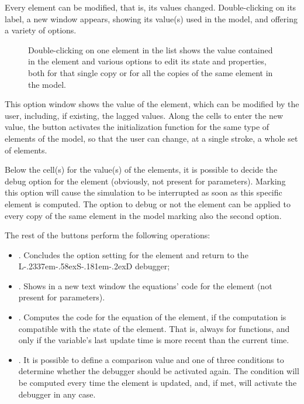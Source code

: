 \documentclass [11pt,a4paper] {book}
\def\LsD{{L\kern-.2337em\lower-.58ex\hbox{S}\kern-.181em\lower-.2ex\hbox{D}}\xspace}
\begin{document}
Every element can be modified, that is, its values changed. Double-clicking on its label, a new window appears, showing its value(s) used in the model, and offering a variety of options.


\begin{figure}[ht]
  \centering
  \caption{\small Double-clicking on one element in the list shows the value contained in the element and various options to edit its state and properties, both for that single copy or for all the copies of the same element in the model.}
  \label{fig:variab_debug}
\end{figure}

This option window shows the value of the element, which can be modified by the user, including, if existing, the lagged values. Along the cells to enter the new value, the button  activates the initialization function for the same type of elements of the model, so that the user can change, at a single stroke, a whole set of elements. 

Below the cell(s) for the value(s) of the elements, it is possible to decide the debug option for the element (obviously, not present for parameters). Marking this option will cause the simulation to be interrupted as soon as this specific element is computed. The option to debug or not the element can be applied to every copy of the same element in the model marking also the second option.

The rest of the buttons perform the following operations:

\begin{itemize}
	\item {}. Concludes the option setting for the element and return to the \LsD debugger;
	\item {}. Shows in a new text window the equations' code for the element (not present for parameters).
	\item {}. Computes the code for the equation of the element, if the computation is compatible with the state of the element. That is, always for functions, and only if the variable's last update time is more recent than the current time.
	\item {}. It is possible to define a comparison value and one of three conditions to determine whether the debugger should be activated again. The condition will be computed every time the element is updated, and, if met, will activate the debugger in any case.
\end{itemize}
\end{document}
